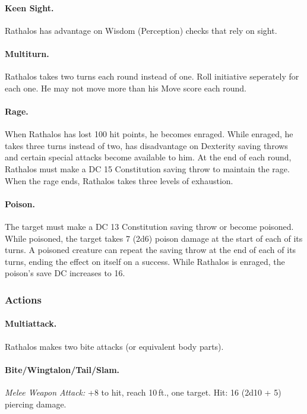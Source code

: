 \begin{hbMonsterNoteWide}[b]
\begin{multicols}{2}
\begin{hbStatBlock}
\paragraph*{Keen Sight.} Rathalos has advantage on Wisdom (Perception) checks that rely on sight.

\paragraph*{Multiturn.} Rathalos takes two turns each round instead of one. Roll initiative seperately for each one. He may not move more than his Move score each round.

\paragraph*{Rage.} When Rathalos has lost 100 hit points, he becomes enraged. While enraged, he takes three turns instead of two, has disadvantage on Dexterity saving throws and certain special attacks become available to him. At the end of each round, Rathalos must make a DC 15 Constitution saving throw to maintain the rage. When the rage ends, Rathalos takes three levels of exhaustion.

\paragraph*{Poison.} The target must make a DC 13 Constitution saving throw or become poisoned. While poisoned, the target takes 7 (2d6) poison damage at the start of each of its turns. A poisoned creature can repeat the saving throw at the end of each of its turns, ending the effect on itself on a success. While Rathalos is enraged, the poison's save DC increases to 16.

\subsubsection*{Actions}

\paragraph*{Multiattack.} Rathalos makes two bite attacks (or equivalent body parts).

\paragraph*{Bite/Wingtalon/Tail/Slam.} \textit{Melee Weapon Attack:} +8 to hit, reach 10\,ft., one target. Hit: 16 (2d10 + 5) piercing damage.


\end{hbStatBlock}
\end{multicols}
\end{hbMonsterNoteWide}
